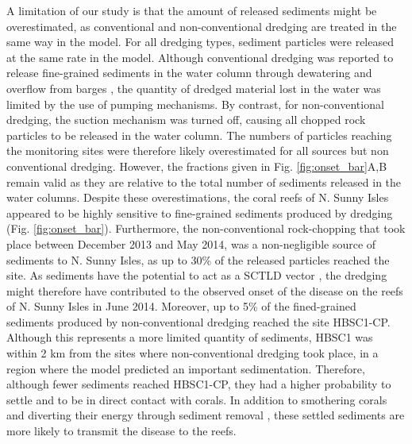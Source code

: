 \documentclass[preprint,12pt,authoryear]{elsarticle}
\begin{document}
A limitation of our study is that the amount of released sediments might be overestimated, as conventional and non-conventional dredging are treated in the same way in the model. For all dredging types, sediment particles were released at the same rate in the model. Although conventional dredging was reported to release fine-grained sediments in the water column through dewatering and overflow from barges \citep{jones2016assessing}, the quantity of dredged material lost in the water was limited by the use of pumping mechanisms. By contrast, for non-conventional dredging, the suction mechanism was turned off, causing all chopped rock particles to be released in the water column. The numbers of particles reaching the monitoring sites were therefore likely overestimated for all sources but non conventional dredging. However, the fractions given in Fig. \ref{fig:onset_bar}A,B remain valid as they are relative to the total number of sediments released in the water columns. Despite these overestimations, the coral reefs of N. Sunny Isles appeared to be highly sensitive to fine-grained sediments produced by dredging (Fig. \ref{fig:onset_bar}). Furthermore, the non-conventional rock-chopping that took place between December 2013 and May 2014, was a non-negligible source of sediments to N. Sunny Isles, as up to 30\% of the released particles reached the site. As sediments have the potential to act as a SCTLD vector \citep{rosales2020rhodobacterales, studivan2022reef}, the dredging might therefore have contributed to the observed onset of the disease on the reefs of N. Sunny Isles in June 2014. Moreover, up to 5\% of the fined-grained sediments produced by non-conventional dredging reached the site HBSC1-CP. Although this represents a more limited quantity of sediments, HBSC1 was within 2 km from the sites where non-conventional dredging took place, in a region where the model predicted an important sedimentation. Therefore, although fewer sediments reached HBSC1-CP, they had a higher probability to settle and to be in direct contact with corals. In addition to smothering corals and diverting their energy through sediment removal \citep{erftemeijer2012environmental}, these settled sediments are more likely to transmit the disease to the reefs.
\end{document}
